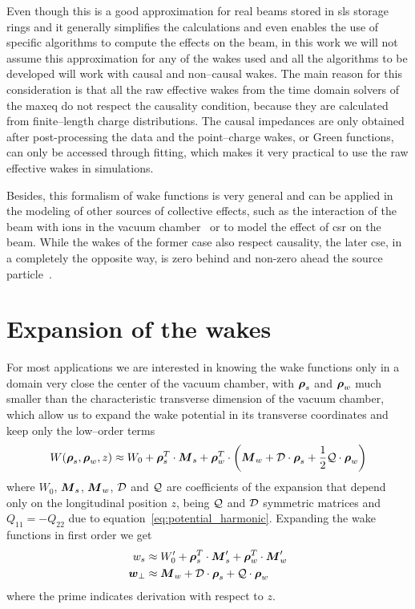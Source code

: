     Even though this is a good approximation for real beams stored in \gls{sls} storage rings and it generally simplifies the calculations and even enables the use of specific algorithms to compute the effects on the beam, in this work we will not assume this approximation for any of the wakes used and all the algorithms to be developed will work with causal and non--causal wakes. The main reason for this consideration is that all the raw effective wakes from the time domain solvers of the \gls{maxeq} do not respect the causality condition, because they are calculated from finite--length charge distributions. The causal impedances are only obtained after post-processing the data and the point--charge wakes, or Green functions, can only be accessed through fitting, which makes it very practical to use the raw effective wakes in simulations.

    Besides, this formalism of wake functions is very general and can be applied in the modeling of other sources of collective effects, such as the interaction of the beam with ions in the vacuum chamber~\cite{Wang2013a} or to model the effect of \gls{csr} on the beam. While the wakes of the former case also respect causality, the later cse, in a completely the opposite way, is zero behind and non-zero ahead the source particle~\cite{Derbenev1995}.

\section{Expansion of the wakes}

    For most applications we are interested in knowing the wake functions only in a domain very close the center of the vacuum chamber, with $\boldsymbol{\rho}_s$ and $\boldsymbol{\rho}_w$ much smaller than the characteristic transverse dimension of the vacuum chamber, which allow us to expand the wake potential in its transverse coordinates and keep only the low--order terms
    \begin{align}\label{eq:wake_potential_expansion}
      	W(\boldsymbol{\rho}_s, \boldsymbol{\rho}_w, z) \approx W_0 +
	  	\boldsymbol{\rho}_s^T\cdot\boldsymbol{M}_s +
        \boldsymbol{\rho}_w^T\cdot\left(\boldsymbol{M}_w +
	  	                         \mathcal{D}\cdot\boldsymbol{\rho}_s +
	  	                         \frac12\mathcal{Q}\cdot\boldsymbol{\rho}_w\right)
    \end{align}
    where $W_0$, $\boldsymbol{M}_s$, $\boldsymbol{M}_w$, $\mathcal{D}$ and $\mathcal{Q}$ are coefficients of the expansion that depend only on the longitudinal position $z$, being $\mathcal{Q}$ and $\mathcal{D}$ symmetric matrices and $Q_{11}=-Q_{22}$ due to equation~\eqref{eq:potential_harmonic}. Expanding the wake functions in first order we get
    \begin{align}\label{eq:wake_functions_expansion}
      	w_s &\approx W'_0 + \boldsymbol{\rho}_s^T\cdot\boldsymbol{M}'_s + \boldsymbol{\rho}_w^T\cdot\boldsymbol{M}'_w \\
	  	\boldsymbol{w}_\perp &\approx \boldsymbol{M}_w + \mathcal{D}\cdot\boldsymbol{\rho}_s + \mathcal{Q}\cdot\boldsymbol{\rho}_w
    \end{align}
    where the prime indicates derivation with respect to $z$.

